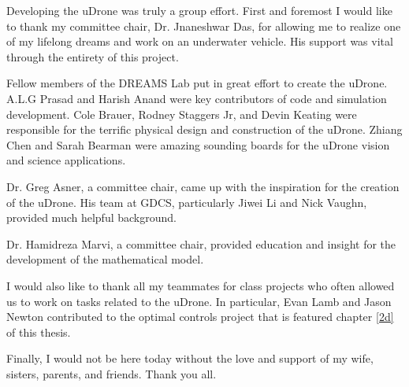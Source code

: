 Developing the uDrone was truly a group effort. First and foremost I would like to thank my committee chair, Dr. Jnaneshwar Das, for allowing me to realize one of my lifelong dreams and work on an underwater vehicle. His support was vital through the entirety of this project.

Fellow members of the DREAMS Lab put in great effort to create the uDrone. A.L.G Prasad and Harish Anand were key contributors of code and simulation development. Cole Brauer, Rodney Staggers Jr, and Devin Keating were responsible for the terrific physical design and construction of the uDrone. Zhiang Chen and Sarah Bearman were amazing sounding boards for the uDrone vision and science applications.

Dr. Greg Asner, a committee chair, came up with the inspiration for the creation of the uDrone. His team at GDCS, particularly Jiwei Li and Nick Vaughn, provided much helpful background. 

Dr. Hamidreza Marvi, a committee chair, provided education and insight for the development of the mathematical model.

I would also like to thank all my teammates for class projects who often allowed us to work on tasks related to the uDrone. In particular, Evan Lamb and Jason Newton contributed to the optimal controls project that is featured chapter \ref{2d} of this thesis.

Finally, I would not be here today without the love and support of my wife, sisters, parents, and friends. Thank you all.